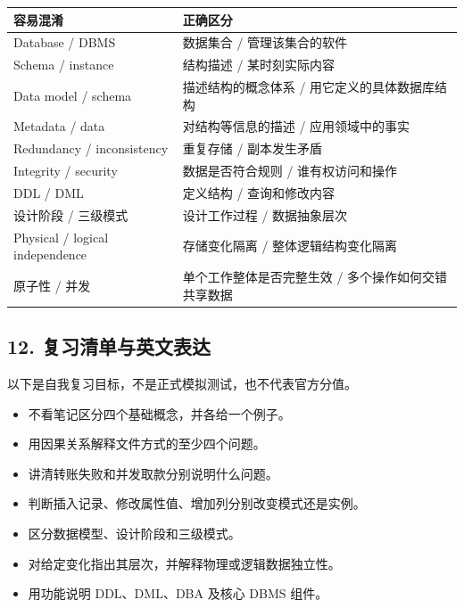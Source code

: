 \begin{longtable}[]{@{}
  >{\raggedright\arraybackslash}p{}
  >{\raggedright\arraybackslash}p{}@{}}
\toprule\noalign{}
\begin{minipage}[b]{\linewidth}\raggedright
容易混淆
\end{minipage} & \begin{minipage}[b]{\linewidth}\raggedright
正确区分
\end{minipage} \\
\midrule\noalign{}
\endhead
\bottomrule\noalign{}
\endlastfoot
Database / DBMS & 数据集合 / 管理该集合的软件 \\
Schema / instance & 结构描述 / 某时刻实际内容 \\
Data model / schema & 描述结构的概念体系 / 用它定义的具体数据库结构 \\
Metadata / data & 对结构等信息的描述 / 应用领域中的事实 \\
Redundancy / inconsistency & 重复存储 / 副本发生矛盾 \\
Integrity / security & 数据是否符合规则 / 谁有权访问和操作 \\
DDL / DML & 定义结构 / 查询和修改内容 \\
设计阶段 / 三级模式 & 设计工作过程 / 数据抽象层次 \\
Physical / logical independence & 存储变化隔离 / 整体逻辑结构变化隔离 \\
原子性 / 并发 & 单个工作整体是否完整生效 / 多个操作如何交错共享数据 \\
\end{longtable}

\subsection{12. 复习清单与英文表达}\label{01_database_fundamentals_zh-ux590dux4e60ux6e05ux5355ux4e0eux82f1ux6587ux8868ux8fbe}

以下是自我复习目标，不是正式模拟测试，也不代表官方分值。

\begin{itemize}
\tightlist
\item[$\square$]
  不看笔记区分四个基础概念，并各给一个例子。
\item[$\square$]
  用因果关系解释文件方式的至少四个问题。
\item[$\square$]
  讲清转账失败和并发取款分别说明什么问题。
\item[$\square$]
  判断插入记录、修改属性值、增加列分别改变模式还是实例。
\item[$\square$]
  区分数据模型、设计阶段和三级模式。
\item[$\square$]
  对给定变化指出其层次，并解释物理或逻辑数据独立性。
\item[$\square$]
  用功能说明 DDL、DML、DBA 及核心 DBMS 组件。
\end{itemize}

